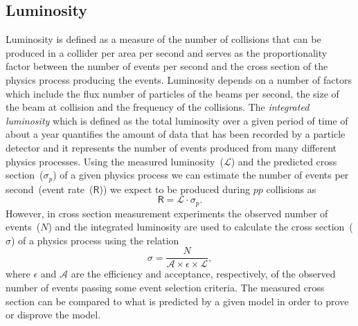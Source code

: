 \subsection{Luminosity}
Luminosity is defined as a measure of the number of collisions that can be produced in a collider per area per second and serves as the proportionality factor between the number of events per second and the cross section of the physics process producing the events. Luminosity depends on a number of factors which include the flux \ie number of particles of the beams per second, the size of the beam at collision and the frequency of the collisions. The \textit{integrated luminosity} which is defined as the total luminosity over a given period of time of about a year quantifies the amount of data that has been recorded by a particle detector and it represents the number of events produced from many different physics processes. Using the  measured luminosity~($\mathscr{L}$) and the predicted cross section~($\sigma_{p}$) of a given physics process we can estimate the number of events per second~(event rate~($\mathsf{R}$)) we expect to be produced during $pp$ collisions as
\begin{equation}
\mathsf{R} = \mathscr{L} \cdot \sigma_{p}.
\end{equation}
However, in cross section measurement experiments the observed number of events~($N$) and the integrated luminosity are used to calculate the cross section~($\sigma$) of a physics process using the relation 
\begin{equation}
\sigma = \frac{N}{\mathscr{A}\times\epsilon\times\mathscr{L}}, 
\end{equation}
where $\epsilon$ and $\mathscr{A}$ are the efficiency and acceptance, respectively, of the observed number of events passing some event selection criteria. The measured cross section can be compared to what is predicted by a given model in order to prove or disprove the model.
